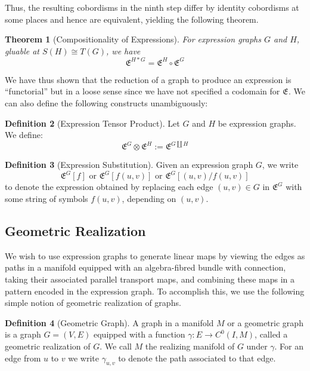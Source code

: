 \documentclass{amsart}
\newcommand{\tensor}{\otimes}
\renewcommand{\to}[1][]{\stackrel{#1}{\longrightarrow}}
\newcommand{\Exp}[1]{\mathfrak{E}^{#1}}
\newtheorem{thm}{Theorem}
\numberwithin{thm}{section}
\theoremstyle{definition}
\newtheorem{defn}[thm]{Definition}
\begin{document}
Thus, the resulting cobordisms in the ninth step differ by identity cobordisms
at some places and hence are equivalent, yielding the following theorem.

\begin{thm}[Compositionality of Expressions]
For expression graphs $G$ and $H$, gluable at $S(H) \cong T(G)$, we have
\[
  \Exp{H * G} = \Exp{H} \circ \Exp{G}
\]
\end{thm}

We have thus shown that the reduction of a graph to produce an expression is
``functorial'' but in a loose sense since we have not specified a codomain for
$\Exp{}$.
We can also define the following constructs unambiguously:

\begin{defn}[Expression Tensor Product]
Let $G$ and $H$ be expression graphs. We define:
\[
  \Exp{G} \tensor \Exp{H} := \Exp{G \amalg H}
\]
\end{defn}

\begin{defn}[Expression Substitution]
Given an expression graph $G$, we write
\[
  \Exp{G}[f] \text{ or } \Exp{G}[f(u, v)] \text{ or } \Exp{G}[(u, v)/f(u, v)]
\]
to denote the expression obtained by replacing each edge $(u, v) \in G$ in
$\Exp{G}$ with some string of symbols $f(u, v)$, depending on $(u, v)$.
\end{defn}

%

\subsection{Geometric Realization}

We wish to use expression graphs to generate linear maps by viewing the edges as
paths in a manifold equipped with an algebra-fibred bundle with connection,
taking their associated parallel transport maps, and combining these maps in a
pattern encoded in the expression graph. To accomplish this, we use the
following simple notion of geometric realization of graphs.

\begin{defn}[Geometric Graph]
A graph in a manifold $M$ or a geometric graph is a graph $G = (V, E)$ equipped
with a function $\gamma : E \to C^0(I, M)$, called a geometric realization of
$G$. We call $M$ the realizing manifold of $G$ under $\gamma$. For an edge from
$u$ to $v$ we write $\gamma_{u, v}$ to denote the path associated to that edge.
\end{defn}
\end{document}
